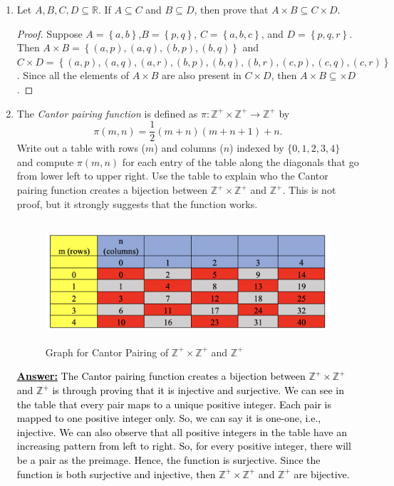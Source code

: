 \documentclass[10pt]{article}
\begin{document}
\begin{enumerate}
	\begin{enumerate}
	
	\item  Let $A, B, C, D \subseteq \mathbb{R}$.  If $A \subseteq C$ and $B \subseteq D$, then prove that $A \times B \subseteq C \times D$.
 
\begin{proof}
 Suppose $A=\left\{a,b\right\}$,$B=\left\{p,q\right\}$, $C=\left\{a,b,c\right\}$, and $D=\left\{p,q,r\right\}$.  Then $A \times B=\left\{(a,p),(a,q),(b,p),(b,q)\right\}$ and $C\times D= \left\{(a,p),(a,q),(a,r),(b,p),(b,q),(b,r),(c,p),(c,q),(c,r)\right\}$. Since all the elements of $A \times B$ are also present in $C \times D$, then $A \times B \subseteq \times D$.
 \end{proof}
	\item  The \emph{Cantor pairing function} is defined as $\pi: \mathbb{Z}^{+} \times \mathbb{Z}^{+} \to \mathbb{Z}^{+}$ by $$\pi(m,n) = \frac{1}{2}(m+n)(m+n+1)+n.$$  Write out a table with rows ($m$) and columns ($n$) indexed by $\{0, 1, 2, 3, 4\}$ and compute $\pi(m,n)$ for each entry of the table along the diagonals that go from lower left to upper right.  Use the table to explain who the Cantor pairing function creates a bijection between $\mathbb{Z}^{+} \times \mathbb{Z}^{+}$ and $\mathbb{Z}^{+}$.  This is not proof, but it strongly suggests that the function works.
\par \medskip
 \begin{figure}[!ht]
\centering  %
\includegraphics[height=45mm]{Homeworks/Homework 3/AML Homework 3 Graph.png}
 \caption{Graph for Cantor Pairing of $\mathbb{Z}^{+} \times \mathbb{Z}^{+}$ and $\mathbb{Z}^{+}$ }
 \label{f:Chart 1}
\end{figure}	
\textbf{\textcolor{black}{\underline{Answer:}}}
\textcolor{black}{The Cantor pairing function creates a bijection between  $\mathbb{Z}^{+} \times \mathbb{Z}^{+}$ and $\mathbb{Z}^{+}$ is through proving that it is injective and surjective.  We can see in the table that every pair maps to a unique positive integer.  Each pair is mapped to one positive integer only.  So, we can say it is one-one, i.e., injective. We can also observe that all positive integers in the table have an increasing pattern from left to right.  So, for every positive integer, there will be a pair as the preimage.  Hence, the function is surjective.  Since the function is both surjective and injective, then $\mathbb{Z}^{+} \times \mathbb{Z}^{+}$ and $\mathbb{Z}^{+}$ are bijective.}

\end{enumerate}
\end{enumerate}
\end{document}
